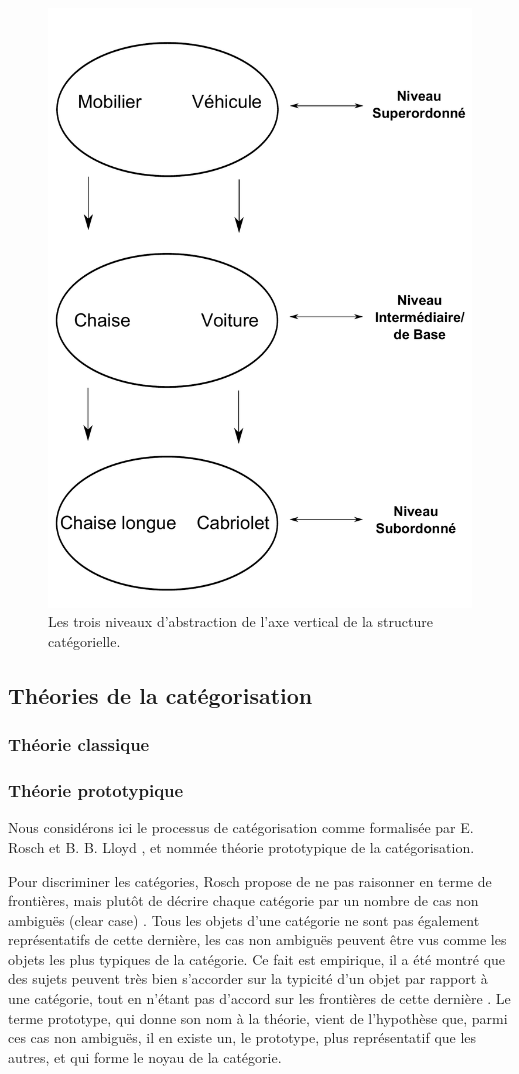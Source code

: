 \begin{figure}[bth]
        \myfloatalign
        \includegraphics[width=.6\linewidth]{gfx/categorieLVL}
        \caption{Les trois niveaux d'abstraction de l'axe vertical de la structure catégorielle.}\label{fig:categorieLVL}
\end{figure}

\subsection{Théories de la catégorisation}


\subsubsection{Théorie classique}

\subsubsection{Théorie prototypique}

Nous considérons ici le processus de catégorisation comme formalisée par E. Rosch et B. B. Lloyd \citep{rosch1978cognition}, et nommée théorie prototypique de la catégorisation. 

Pour discriminer les catégories, Rosch propose de ne pas raisonner en terme de frontières, mais plutôt de décrire chaque catégorie par un nombre de cas non ambiguës (clear case) \citep[p. 36]{rosch1978cognition}. Tous les objets d'une catégorie ne sont pas également représentatifs de cette dernière, les cas non ambiguës peuvent être vus comme les objets les plus typiques de la catégorie. Ce fait est empirique, il a été montré que des sujets peuvent très bien s'accorder sur la typicité d'un objet par rapport à une catégorie, tout en n'étant pas d'accord sur les frontières de cette dernière \citep{rosch1974human,rosch1975cognitive}. Le terme prototype, qui donne son nom à la théorie, vient de l'hypothèse que, parmi ces cas non ambiguës, il en existe un, le prototype, plus représentatif que les autres, et qui forme le noyau de la catégorie.

